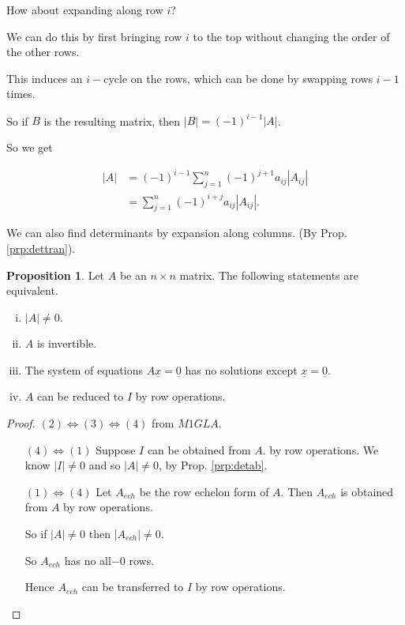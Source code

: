 \documentclass{article}
\theoremstyle{definition} \newtheorem*{definition}{Definition}
\newtheorem{proposition}[theorem]{Proposition}
\begin{document}
   How about expanding along row $i$?

   We can do this by first bringing row $i$ to the top without changing the
   order of the other rows.

   This induces an $i-$cycle on the rows, which can be done by swapping
   rows $i-1$ times.

   So if $B$ is the resulting matrix, then $|B|=(-1)^{i-1}|A|$.

   So we get

   \begin{align*}
     |A| &= (-1)^{i-1} \sum_{j=1}^n (-1)^{j+1} a_{ij} |A_{ij}| \\
     &= \sum_{j=1}^n (-1)^{i+j} a_{ij} |A_{ij}|.
   \end{align*}

   \begin{remark}
     We can also find determinants by expansion along columns. (By Prop. \ref{prp:dettran}).
   \end{remark}
  
   \begin{proposition}
     Let $A$ be an $n\times n$ matrix.
     The following statements are equivalent. 
     \begin{enumerate}[(i)]
       \item $|A| \neq 0$.
       \item $A$ is invertible.
       \item The system of equations $A\underline{x}=\underline{0}$ has no 
         solutions except $\underline{x}=\underline{0}$.
       \item $A$ can be reduced to $I$ by row operations.
     \end{enumerate}
   \end{proposition}

   \begin{proof}
     $(2) \iff (3) \iff (4)$ from $M1GLA$.
     \begin{itemize}
       \item[$(4) \iff (1)$] Suppose $I$ can be obtained from $A$. by row
         operations. We know $|I|\neq 0$ and so $|A|\neq 0$, by Prop.
         \ref{prp:detab}.

       \item[$(1)\iff (4)$] Let $A_{ech}$ be the row echelon form of $A$.
         Then $A_{ech}$ is obtained from $A$ by row operations.

         So if $|A|\neq 0$ then $|A_{ech}| \neq 0$.

         So $A_{ech}$ has no all$-0$ rows.

         Hence $A_{ech}$ can be transferred to $I$ by row operations.
     \end{itemize}
   \end{proof}
\end{document}
